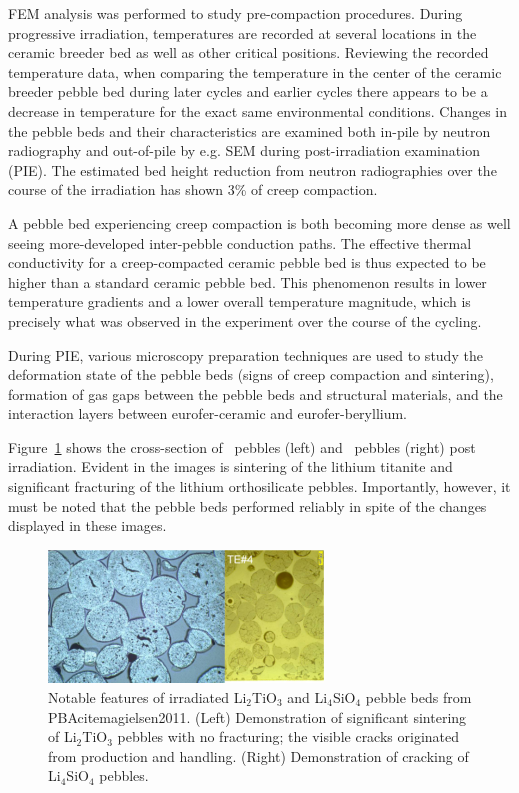 \documentclass[11pt]{report} %
\newcommand{\lit}{\ce{Li2TiO3}}
\newcommand{\lis}{\ce{Li4SiO4}}
\begin{document}
FEM analysis was performed to study pre-compaction procedures.  During progressive irradiation, temperatures are recorded at several locations in the ceramic breeder bed as well as other critical positions. Reviewing the recorded temperature data, when comparing the temperature in the center of the ceramic breeder pebble bed during later cycles and earlier cycles there appears to be a decrease in temperature for the exact same environmental conditions. Changes in the pebble beds and their characteristics are examined both in-pile by neutron radiography and out-of-pile by e.g. SEM during post-irradiation examination (PIE). The estimated bed height reduction from neutron radiographies over the course of the irradiation has shown 3\% of creep compaction. 

A pebble bed experiencing creep compaction is both becoming more dense as well seeing more-developed inter-pebble conduction paths. The effective thermal conductivity for a creep-compacted ceramic pebble bed is thus expected to be higher than a standard ceramic pebble bed. This phenomenon results in lower temperature gradients and a lower overall temperature magnitude, which is precisely what was observed in the experiment over the course of the cycling. 

During PIE, various microscopy preparation techniques are used to study the deformation state of the pebble beds (signs of creep compaction and sintering), formation of gas gaps between the pebble beds and structural materials, and the interaction layers between eurofer-ceramic and eurofer-beryllium. 

Figure~\ref{fig:pba} shows the cross-section of \lit~pebbles (left) and \lis~pebbles (right) post irradiation. Evident in the images is sintering of the lithium titanite and significant fracturing of the lithium orthosilicate pebbles. Importantly, however, it must be noted that the pebble beds performed reliably in spite of the changes displayed in these images.\cite{Magielsen2007} 


\begin{figure}[h]
\centering
\includegraphics[width=0.65\textwidth]{images/Fig-10}
\caption{Notable features of irradiated Li$_2$TiO$_3$ and Li$_4$SiO$_4$ pebble beds from PBAcite{magielsen2011}. (Left) Demonstration of significant sintering of Li$_2$TiO$_3$ pebbles with no fracturing; the visible cracks originated from production and handling. (Right) Demonstration of cracking of Li$_4$SiO$_4$ pebbles.}
\label{fig:pba}
\end{figure}
\end{document}
